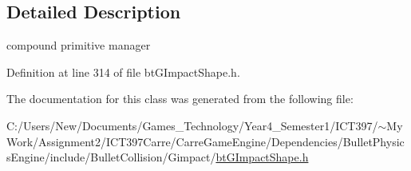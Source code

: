 \subsection{Detailed Description}
compound primitive manager 

Definition at line 314 of file btGImpactShape.h.

The documentation for this class was generated from the following file:\begin{CompactItemize}
\item 
C:/Users/New/Documents/Games\_\-Technology/Year4\_\-Semester1/ICT397/$\sim$My Work/Assignment2/ICT397Carre/CarreGameEngine/Dependencies/BulletPhysicsEngine/include/BulletCollision/Gimpact/\hyperlink{bt_g_impact_shape_8h}{btGImpactShape.h}\end{CompactItemize}
